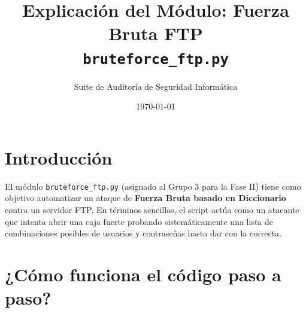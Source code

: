 \documentclass[12pt,a4paper]{article}
\title{\textbf{Explicación del Módulo: Fuerza Bruta FTP}\\ \large \texttt{bruteforce\_ftp.py}}
\author{Suite de Auditoría de Seguridad Informática}
\date{\today}
\begin{document}
\maketitle

\section*{Introducción}
El módulo \texttt{bruteforce\_ftp.py} (asignado al Grupo 3 para la Fase II) tiene como objetivo automatizar un ataque de \textbf{Fuerza Bruta basado en Diccionario} contra un servidor FTP. En términos sencillos, el script actúa como un atacante que intenta abrir una caja fuerte probando sistemáticamente una lista de combinaciones posibles de usuarios y contraseñas hasta dar con la correcta.

\section*{¿Cómo funciona el código paso a paso?}
\end{document}
